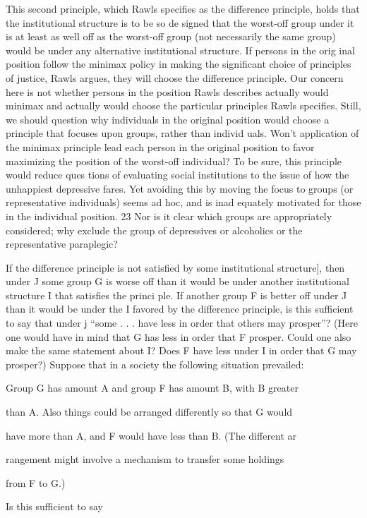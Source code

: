 \documentclass[11pt,openany]{book}
\begin{document}
This second principle, which Rawls specifies as the difference principle, holds that the institutional structure is to be so de signed that the worst-off group under it is at least as well off as the worst-off group (not necessarily the same group) would be under any alternative institutional structure. If persons in the orig inal position follow the minimax policy in making the significant choice of principles of justice, Rawls argues, they will choose the difference principle. Our concern here is not whether persons in the position Rawls describes actually would minimax and actually would choose the particular principles Rawls specifies. Still, we should question why individuals in the original position would choose a principle that focuses upon groups, rather than individ uals. Won't application of the minimax principle lead each person in the original position to favor maximizing the position of the worst-off individual? To be sure, this principle would reduce ques tions of evaluating social institutions to the issue of how the unhappiest depressive fares. Yet avoiding this by moving the focus to groups (or representative individuals) seems ad hoc, and is inad equately motivated for those in the individual position. 23 Nor is it clear which groups are appropriately considered; why exclude the group of depressives or alcoholics or the representative paraplegic? 

If the difference principle is not satisfied by some institutional structure], then under J some group G is worse off than it would be under another institutional structure I that satisfies the princi ple. If another group F is better off under J than it would be under the I favored by the difference principle, is this sufficient to say that under j ``some . . . have less in order that others may prosper''? (Here one would have in mind that G has less in order that F prosper. Could one also make the same statement about I? Does F have less under I in order that G may prosper?) Suppose that in a society the following situation prevailed: 

Group G has amount A and group F has amount B, with B greater 

than A. Also things could be arranged differently so that G would 

have more than A, and F would have less than B. (The different ar

rangement might involve a mechanism to transfer some holdings 

from F to G.) 

Is this sufficient to say 
\end{document}
